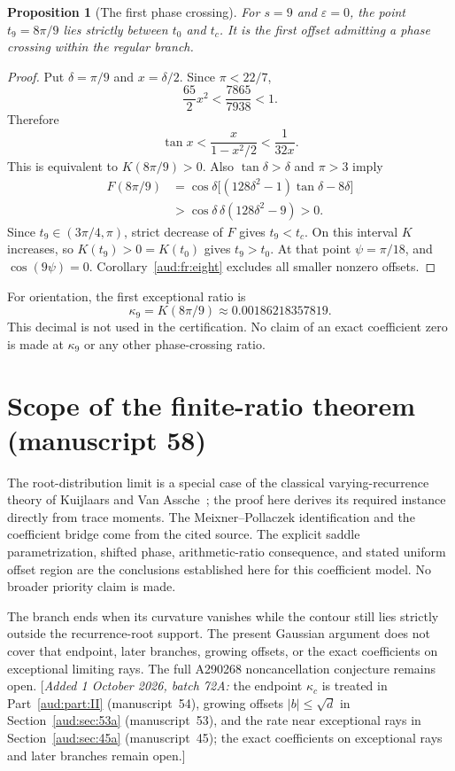 \documentclass[11pt,a4paper]{article}
\numberwithin{equation}{section}
\newtheorem{proposition}[theorem]{Proposition}
\newcommand{\addednote}[1]{{\small[\textit{Added 1 October 2026, batch 72A:} #1]}}
\begin{document}
\begin{proposition}[The first phase crossing]\label{aud:fr:nine}
For $s=9$ and $\varepsilon=0$, the point $t_9=8\pi/9$ lies strictly between $t_0$ and $t_c$. It is the first offset admitting a phase crossing within the regular branch.
\end{proposition}
\begin{proof}
Put $\delta=\pi/9$ and $x=\delta/2$. Since $\pi<22/7$,
\[
 \frac{65}{2}x^2<\frac{7865}{7938}<1.
\]
Therefore
\[
 \tan x<\frac{x}{1-x^2/2}<\frac1{32x}.
\]
This is equivalent to $K(8\pi/9)>0$. Also $\tan\delta>\delta$ and $\pi>3$ imply
\begin{align*}
 F(8\pi/9)
 &=\cos\delta\bigl[(128\delta^2-1)\tan\delta-8\delta\bigr]\\
 &>\cos\delta\,\delta(128\delta^2-9)>0.
\end{align*}
Since $t_9\in(3\pi/4,\pi)$, strict decrease of $F$ gives $t_9<t_c$. On this interval $K$ increases, so $K(t_9)>0=K(t_0)$ gives $t_9>t_0$. At that point $\psi=\pi/18$, and $\cos(9\psi)=0$. Corollary~\ref{aud:fr:eight} excludes all smaller nonzero offsets.
\end{proof}

For orientation, the first exceptional ratio is
\[
 \kappa_9=K(8\pi/9)\approx0.00186218357819.
\]
This decimal is not used in the certification. No claim of an exact coefficient zero is made at $\kappa_9$ or any other phase-crossing ratio.
\section{Scope of the finite-ratio theorem (manuscript 58)}\label{aud:sec:58scope}
The root-distribution limit is a special case of the classical varying-recurrence theory of Kuijlaars and Van Assche~\cite{kuijlaars}; the proof here derives its required instance directly from trace moments. The Meixner--Pollaczek identification and the coefficient bridge come from the cited source. The explicit saddle parametrization, shifted phase, arithmetic-ratio consequence, and stated uniform offset region are the conclusions established here for this coefficient model. No broader priority claim is made.

The branch ends when its curvature vanishes while the contour still lies strictly outside the recurrence-root support. The present Gaussian argument does not cover that endpoint, later branches, growing offsets, or the exact coefficients on exceptional limiting rays. The full A290268 noncancellation conjecture remains open. \addednote{the endpoint $\kappa_c$ is treated in Part~\ref{aud:part:II} (manuscript~54), growing offsets $|b|\le\sqrt d$ in Section~\ref{aud:sec:53a} (manuscript~53), and the rate near exceptional rays in Section~\ref{aud:sec:45a} (manuscript~45); the exact coefficients on exceptional rays and later branches remain open.}
\end{document}
